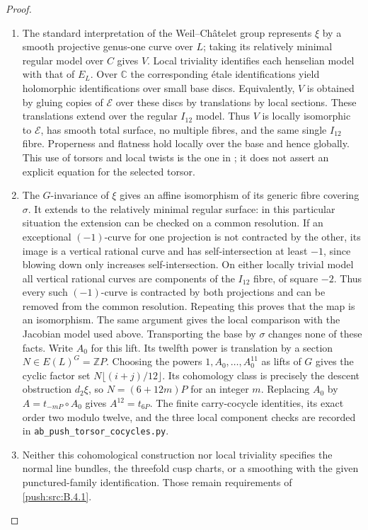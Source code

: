 \begin{proof}
\begin{enumerate}[label=\arabic*.,leftmargin=*]
\item The standard interpretation of the
Weil--Ch\^atelet group represents
$\xi$ by a smooth projective genus-one
curve over $L$; taking its relatively
minimal regular model over $C$ gives
$V$. Local triviality identifies each
henselian model with that of $E_L$.
Over $\mathbb C$ the corresponding
\'etale identifications yield
holomorphic identifications over small
base discs. Equivalently, $V$ is obtained
by gluing copies of $\mathscr E$ over
these discs by translations by local
sections. These translations extend
over the regular $I_{12}$ model.
Thus $V$ is locally isomorphic to
$\mathscr E$, has smooth total surface,
no multiple fibres, and the same single
$I_{12}$ fibre. Properness and flatness
hold locally over the base and hence
globally. This use of torsors and local
twists is the one in
\cite[Sections 3--4]{Xiao91}; it does
not assert an explicit equation for
the selected torsor.

\item The $G$-invariance of $\xi$ gives an
affine isomorphism of its generic fibre
covering $\sigma$. It extends to the
relatively minimal regular surface:
in this particular situation the
extension can be checked on a common
resolution. If an exceptional
$(-1)$-curve for one projection is not
contracted by the other, its image is
a vertical rational curve and has
self-intersection at least $-1$,
since blowing down only increases
self-intersection. On either locally
trivial model all vertical rational
curves are components of the $I_{12}$
fibre, of square $-2$. Thus every such
$(-1)$-curve is contracted by both
projections and can be removed from
the common resolution. Repeating this
proves that the map is an isomorphism.
The same argument gives the local
comparison with the Jacobian model
used above. Transporting the base by
$\sigma$ changes none of these facts.
Write $A_0$ for this lift. Its twelfth
power is translation by a section
$N\in E(L)^G=\mathbb ZP$.
Choosing the powers $1,A_0,\ldots,A_0^{11}$
as lifts of $G$ gives the cyclic
factor set
$N\lfloor(i+j)/12\rfloor$.
Its cohomology class is precisely the
descent obstruction $d_2\xi$, so
$N=(6+12m)P$ for an integer $m$.
Replacing $A_0$ by $A=t_{-mP}\circ A_0$
gives $A^{12}=t_{6P}$.
The finite carry-cocycle identities,
its exact order two modulo twelve,
and the three local component checks
are recorded in
\texttt{ab\_push\_torsor\_cocycles.py}.

\item Neither this cohomological construction
nor local triviality specifies the
normal line bundles, the threefold
cusp charts, or a smoothing with the
given punctured-family identification.
Those remain requirements of \ref{push:src:B.4.1}.
\end{enumerate}
\end{proof}

